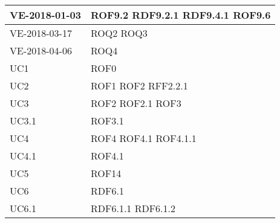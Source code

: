 \documentclass[../AnalisideiRequisiti.tex]{subfiles}
\begin{document}
\begin{longtable}{| p{4cm} | p{4cm} |}
	\hline
		\newline VE-2018-01-03 & \newline ROF9.2 \newline RDF9.2.1 \newline RDF9.4.1 \newline ROF9.6 \\[1em]
	\hline
		\newline VE-2018-03-17 & \newline ROQ2 \newline ROQ3 \\[1em]
	\hline
		\newline VE-2018-04-06 & \newline ROQ4 \\[1em]	
		

	\hline
		\newline UC1 &  \newline ROF0 \\[1em]
	\hline
		\newline UC2 &  \newline ROF1 \newline ROF2 \newline RFF2.2.1   \\[1em]	
		\hline
		\newline UC3 &  \newline ROF2 \newline ROF2.1 \newline ROF3 \\[1em]	
		\hline
		\newline UC3.1 &  \newline ROF3.1 \\[1em]	
		\hline
		\newline UC4 &  \newline ROF4 \newline ROF4.1 \newline ROF4.1.1 \\[1em]
		\hline
		\newline UC4.1 &  \newline ROF4.1 \\[1em]
		\hline
		\newline UC5 &  \newline ROF14 \\[1em]
		\hline
		\newline UC6 &  \newline RDF6.1 \\[1em]
		\hline
		\newline UC6.1 &  \newline RDF6.1.1 \newline RDF6.1.2 \\[1em]

\end{longtable}
\end{document}
